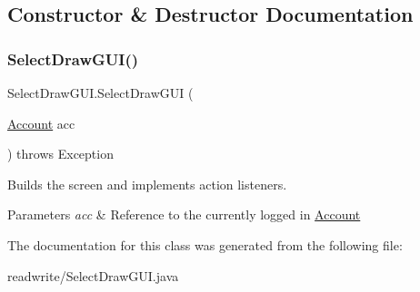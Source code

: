 \subsection{Constructor \& Destructor Documentation}
\mbox{\label{class_select_draw_g_u_i_a5437524cbdb011b9afd066ed51a8830d}} 
\subsubsection{\texorpdfstring{Select\+Draw\+G\+U\+I()}{SelectDrawGUI()}}
{\footnotesize\ttfamily Select\+Draw\+G\+U\+I.\+Select\+Draw\+G\+UI (\begin{DoxyParamCaption}\item[{\hyperlink{class_account}{Account}}]{acc }\end{DoxyParamCaption}) throws Exception}



Builds the screen and implements action listeners. 


\begin{DoxyParams}{Parameters}
{\em acc} & Reference to the currently logged in \hyperlink{class_account}{Account} \\
\hline
\end{DoxyParams}


The documentation for this class was generated from the following file\+:\begin{DoxyCompactItemize}
\item 
readwrite/Select\+Draw\+G\+U\+I.\+java\end{DoxyCompactItemize}
